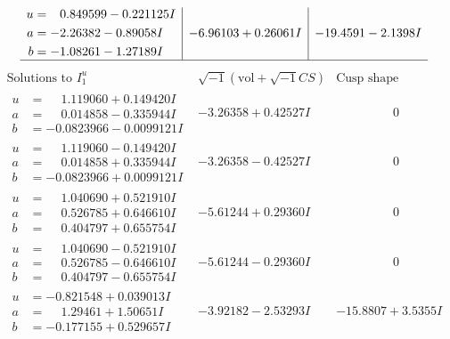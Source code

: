 \documentclass[1p]{elsarticle_modified}
\theoremstyle{definition}
\newcommand{\I}{\sqrt{-1}}
\begin{document}
$$\begin{array}{c|c|c}
\begin{aligned}
u &= \phantom{-}0.849599 - 0.221125 I \\
a &= -2.26382 - 0.89058 I \\
b &= -1.08261 - 1.27189 I\end{aligned}
 & -6.96103 + 0.26061 I & -19.4591 - 2.1398 I\\
 \hline 
 \end{array}$$\newpage$$\begin{array}{c|c|c}  
\text{Solutions to }I^u_{1}& \I (\text{vol} + \sqrt{-1}CS) & \text{Cusp shape}\\
 \hline 
\begin{aligned}
u &= \phantom{-}1.119060 + 0.149420 I \\
a &= \phantom{-}0.014858 - 0.335944 I \\
b &= -0.0823966 - 0.0099121 I\end{aligned}
 & -3.26358 + 0.42527 I & \phantom{-0.000000 } 0 \\ \hline\begin{aligned}
u &= \phantom{-}1.119060 - 0.149420 I \\
a &= \phantom{-}0.014858 + 0.335944 I \\
b &= -0.0823966 + 0.0099121 I\end{aligned}
 & -3.26358 - 0.42527 I & \phantom{-0.000000 } 0 \\ \hline\begin{aligned}
u &= \phantom{-}1.040690 + 0.521910 I \\
a &= \phantom{-}0.526785 + 0.646610 I \\
b &= \phantom{-}0.404797 + 0.655754 I\end{aligned}
 & -5.61244 + 0.29360 I & \phantom{-0.000000 } 0 \\ \hline\begin{aligned}
u &= \phantom{-}1.040690 - 0.521910 I \\
a &= \phantom{-}0.526785 - 0.646610 I \\
b &= \phantom{-}0.404797 - 0.655754 I\end{aligned}
 & -5.61244 - 0.29360 I & \phantom{-0.000000 } 0 \\ \hline\begin{aligned}
u &= -0.821548 + 0.039013 I \\
a &= \phantom{-}1.29461 + 1.50651 I \\
b &= -0.177155 + 0.529657 I\end{aligned}
 & -3.92182 - 2.53293 I & -15.8807 + 3.5355 I \\ \hline\begin{aligned}

\end{aligned}
\end{array}$$
\end{document}
